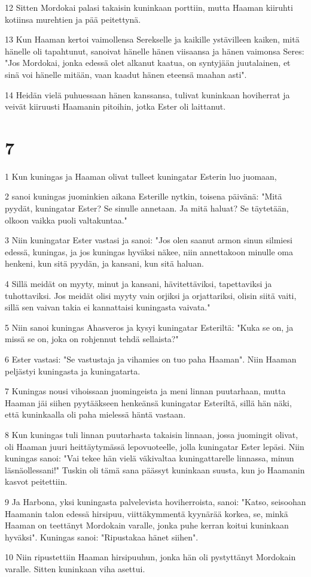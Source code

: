 \par 12 Sitten Mordokai palasi takaisin kuninkaan porttiin, mutta Haaman kiiruhti kotiinsa murehtien ja pää peitettynä.
\par 13 Kun Haaman kertoi vaimollensa Serekselle ja kaikille ystävilleen kaiken, mitä hänelle oli tapahtunut, sanoivat hänelle hänen viisaansa ja hänen vaimonsa Seres: "Jos Mordokai, jonka edessä olet alkanut kaatua, on syntyjään juutalainen, et sinä voi hänelle mitään, vaan kaadut hänen eteensä maahan asti".
\par 14 Heidän vielä puhuessaan hänen kanssansa, tulivat kuninkaan hoviherrat ja veivät kiiruusti Haamanin pitoihin, jotka Ester oli laittanut.

\chapter{7}

\par 1 Kun kuningas ja Haaman olivat tulleet kuningatar Esterin luo juomaan,
\par 2 sanoi kuningas juominkien aikana Esterille nytkin, toisena päivänä: "Mitä pyydät, kuningatar Ester? Se sinulle annetaan. Ja mitä haluat? Se täytetään, olkoon vaikka puoli valtakuntaa."
\par 3 Niin kuningatar Ester vastasi ja sanoi: "Jos olen saanut armon sinun silmiesi edessä, kuningas, ja jos kuningas hyväksi näkee, niin annettakoon minulle oma henkeni, kun sitä pyydän, ja kansani, kun sitä haluan.
\par 4 Sillä meidät on myyty, minut ja kansani, hävitettäviksi, tapettaviksi ja tuhottaviksi. Jos meidät olisi myyty vain orjiksi ja orjattariksi, olisin siitä vaiti, sillä sen vaivan takia ei kannattaisi kuningasta vaivata."
\par 5 Niin sanoi kuningas Ahasveros ja kysyi kuningatar Esteriltä: "Kuka se on, ja missä se on, joka on rohjennut tehdä sellaista?"
\par 6 Ester vastasi: "Se vastustaja ja vihamies on tuo paha Haaman". Niin Haaman peljästyi kuningasta ja kuningatarta.
\par 7 Kuningas nousi vihoissaan juomingeista ja meni linnan puutarhaan, mutta Haaman jäi siihen pyytääkseen henkeänsä kuningatar Esteriltä, sillä hän näki, että kuninkaalla oli paha mielessä häntä vastaan.
\par 8 Kun kuningas tuli linnan puutarhasta takaisin linnaan, jossa juomingit olivat, oli Haaman juuri heittäytymässä lepovuoteelle, jolla kuningatar Ester lepäsi. Niin kuningas sanoi: "Vai tekee hän vielä väkivaltaa kuningattarelle linnassa, minun läsnäollessani!" Tuskin oli tämä sana päässyt kuninkaan suusta, kun jo Haamanin kasvot peitettiin.
\par 9 Ja Harbona, yksi kuningasta palvelevista hoviherroista, sanoi: "Katso, seisoohan Haamanin talon edessä hirsipuu, viittäkymmentä kyynärää korkea, se, minkä Haaman on teettänyt Mordokain varalle, jonka puhe kerran koitui kuninkaan hyväksi". Kuningas sanoi: "Ripustakaa hänet siihen".
\par 10 Niin ripustettiin Haaman hirsipuuhun, jonka hän oli pystyttänyt Mordokain varalle. Sitten kuninkaan viha asettui.

